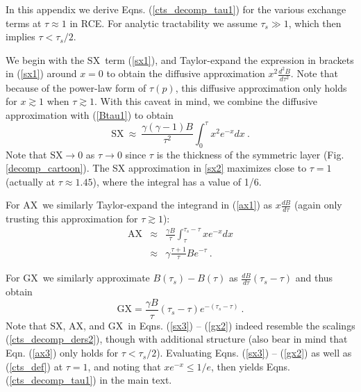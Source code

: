 \documentclass{ametsoc}
\newcommand{\beqn}{\begin{equation}}
\newcommand{\eeqn}{\end{equation}}
\newcommand{\beqa}{\begin{eqnarray}}
\newcommand{\eeqa}{\end{eqnarray}}
\newcommand{\n}{\nonumber}
\newcommand{\eqnref}[1]{(\ref{#1})}
\newcommand{\der}[2]{\ensuremath{\frac{d #1}{d #2}}}
\newcommand{\taus}{\ensuremath{\tau_s}}
\newcommand{\SX}{\ensuremath{\mathrm{SX}}}
\newcommand{\AX}{\ensuremath{\mathrm{AX}}}
\newcommand{\GX}{\ensuremath{\mathrm{GX}}}
\begin{document}

\appendix[A]
\label{appendix_cts}
In this appendix we derive Eqns. \eqnref{cts_decomp_tau1} for the various exchange terms at $\tau\approx1$ in RCE. For analytic tractability we assume $\taus \gg 1$, which then implies $\tau < \taus/2$.

We begin with the \SX\ term \eqnref{sx1}, and Taylor-expand the expression in brackets in \eqnref{sx1} around $x=0$ to obtain the diffusive approximation $x^2\frac{d^2 B}{d \tau^2}$. Note that because of the power-law form of $\tau(p)$, this diffusive approximation only holds for $x\gtrsim 1$ when $\tau\gtrsim 1$. With this caveat in mind,  we combine the diffusive approximation with \eqnref{Btau1} to obtain
\beqn
 	\SX  \ \approx \    \frac{\gamma(\gamma-1) B}{ \tau^2} \int_0^\tau x^2 e^{-x} dx \ .
	\label{sx3}
\eeqn
Note that $\SX \rightarrow 0$ as $\tau\rightarrow 0$ since $\tau$ is the thickness of the symmetric layer (Fig. \ref{decomp_cartoon}). The SX  approximation in \eqref{sx2}  maximizes close to $\tau=1$ (actually at $\tau\approx 1.45$), where the integral has a value of 1/6. 

 For \AX\ we similarly Taylor-expand the integrand in \eqnref{ax1} as $x\frac{d B}{d \tau}$ (again only trusting this approximation for  $\tau \gtrsim 1$):
\beqa
 	\AX &  \approx  &    \frac{\gamma B}{ \tau} \int_\tau^{\taus - \tau} x e^{-x} dx \n 	  \\
		   &  \approx  & \gamma \frac{\tau+1}{\tau}B e^{-\tau}  \ . \label{ax3} 
\eeqa

For \GX\  we similarly approximate $B(\taus) - B(\tau)$ as $\der{B}{\tau} (\taus-\tau)$ and thus obtain
\beqn
	\GX  =    \frac{\gamma B}{\tau}(\taus-\tau)e^{-(\taus-\tau)}  \ .
	\label{gx2}
\eeqn
Note that \SX, \AX, and \GX\  in  Eqns. \eqnref{sx3} -- \eqnref{gx2} indeed resemble the scalings \eqnref{cts_decomp_ders2}, though with additional structure (also bear in mind that Eqn. \eqnref{ax3} only holds for $\tau < \taus/2$).  Evaluating Eqns. \eqnref{sx3} -- \eqnref{gx2} as well as  \eqnref{cts_def} at $\tau=1$, and noting that $xe^{-x}\leq 1/e$, then yields Eqns. \eqnref{cts_decomp_tau1} in the main text.
\end{document}
